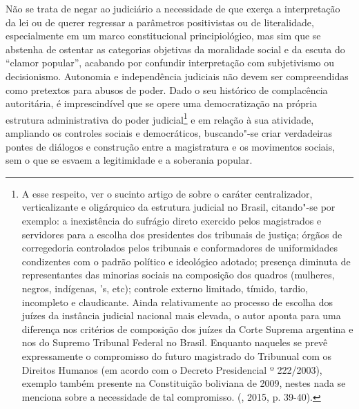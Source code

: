 Não se trata de negar ao judiciário a necessidade de que exerça a
interpretação da lei ou de querer regressar a parâmetros positivistas ou
de literalidade, especialmente em um marco constitucional
principiológico, mas sim que se abstenha de ostentar as categorias
objetivas da moralidade social e da escuta do ``clamor popular'', acabando
por confundir interpretação com subjetivismo ou decisionismo. Autonomia
e independência judiciais não devem ser compreendidas como pretextos
para abusos de poder. Dado o seu histórico de complacência autoritária,
é imprescindível que se opere uma democratização na própria estrutura
administrativa do poder judicial\footnote{A esse respeito, ver o sucinto
  artigo de  sobre o caráter centralizador, verticalizante
  e oligárquico da estrutura judicial no Brasil, citando"-se por exemplo:
  a inexistência do sufrágio direto exercido pelos magistrados e
  servidores para a escolha dos presidentes dos tribunais de justiça;
  órgãos de corregedoria controlados pelos tribunais e conformadores de
  uniformidades condizentes com o padrão político e ideológico adotado;
  presença diminuta de representantes das minorias sociais na composição
  dos quadros (mulheres, negros, indígenas, 's, etc); controle
  externo limitado, tímido, tardio, incompleto e claudicante. Ainda
  relativamente ao processo de escolha dos juízes da instância judicial
  nacional mais elevada, o autor aponta para uma diferença nos critérios
  de composição dos juízes da Corte Suprema argentina e nos do Supremo
  Tribunal Federal no Brasil. Enquanto naqueles se prevê expressamente o
  compromisso do futuro magistrado do Tribunual com os Direitos Humanos
  (em acordo com o Decreto Presidencial º 222/2003), exemplo também
  presente na Constituição boliviana de 2009, nestes nada se menciona
  sobre a necessidade de tal compromisso. (, 2015,
  p. 39-40).} e em relação à sua atividade, ampliando os controles
sociais e democráticos, buscando"-se criar verdadeiras pontes de diálogos
e construção entre a magistratura e os movimentos sociais, sem o que se
esvaem a legitimidade e a soberania popular.


